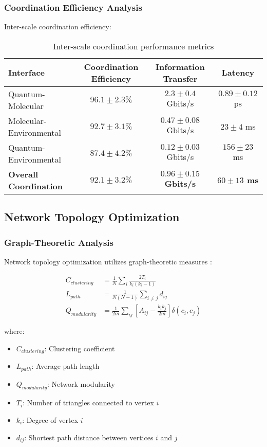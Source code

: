 \subsubsection{Coordination Efficiency Analysis}

Inter-scale coordination efficiency:

\begin{table}[H]
\centering
\begin{tabular}{|l|c|c|c|}
\hline
\textbf{Interface} & \textbf{Coordination Efficiency} & \textbf{Information Transfer} & \textbf{Latency} \\
\hline
Quantum-Molecular & $96.1 \pm 2.3\%$ & $2.3 \pm 0.4$ Gbits/s & $0.89 \pm 0.12$ ps \\
Molecular-Environmental & $92.7 \pm 3.1\%$ & $0.47 \pm 0.08$ Gbits/s & $23 \pm 4$ ms \\
Quantum-Environmental & $87.4 \pm 4.2\%$ & $0.12 \pm 0.03$ Gbits/s & $156 \pm 23$ ms \\
\hline
\textbf{Overall Coordination} & \textbf{$92.1 \pm 3.2\%$} & \textbf{$0.96 \pm 0.15$ Gbits/s} & \textbf{$60 \pm 13$ ms} \\
\hline
\end{tabular}
\caption{Inter-scale coordination performance metrics}
\end{table}

\subsection{Network Topology Optimization}

\subsubsection{Graph-Theoretic Analysis}

Network topology optimization utilizes graph-theoretic measures \cite{newman2010networks,barabasi2016network}:

\begin{align}
C_{clustering} &= \frac{1}{N} \sum_i \frac{2T_i}{k_i(k_i-1)} \\
L_{path} &= \frac{1}{N(N-1)} \sum_{i \neq j} d_{ij} \\
Q_{modularity} &= \frac{1}{2m} \sum_{ij} \left[ A_{ij} - \frac{k_i k_j}{2m} \right] \delta(c_i, c_j)
\end{align}

where:
\begin{itemize}
\item $C_{clustering}$: Clustering coefficient
\item $L_{path}$: Average path length  
\item $Q_{modularity}$: Network modularity
\item $T_i$: Number of triangles connected to vertex $i$
\item $k_i$: Degree of vertex $i$
\item $d_{ij}$: Shortest path distance between vertices $i$ and $j$
\end{itemize}

